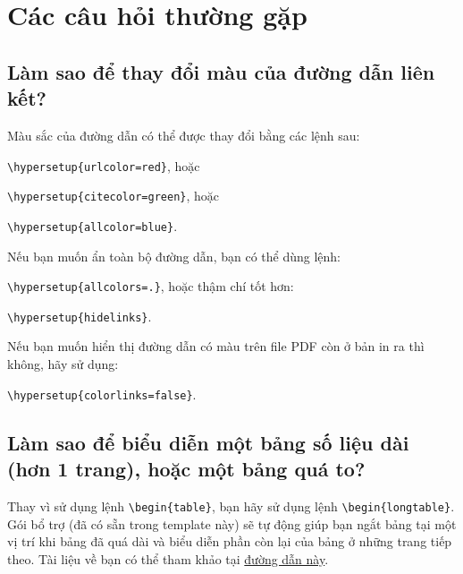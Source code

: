 
\chapter{Các câu hỏi thường gặp} %

\label{AppendixA} %


\section{Làm sao để thay đổi màu của đường dẫn liên kết?}

Màu sắc của đường dẫn có thể được thay đổi bằng các lệnh sau:

{\small\verb!\hypersetup{urlcolor=red}!}, hoặc

{\small\verb!\hypersetup{citecolor=green}!}, hoặc

{\small\verb!\hypersetup{allcolor=blue}!}.

\noindent Nếu bạn muốn ẩn toàn bộ đường dẫn, bạn có thể dùng lệnh:

{\small\verb!\hypersetup{allcolors=.}!}, hoặc thậm chí tốt hơn: 

{\small\verb!\hypersetup{hidelinks}!}.

\noindent Nếu bạn muốn hiển thị đường dẫn có màu trên file PDF còn ở bản in ra thì không, hãy sử dụng:

{\small\verb!\hypersetup{colorlinks=false}!}.



\section{Làm sao để biểu diễn một bảng số liệu dài (hơn 1 trang), hoặc một bảng quá to?}

Thay vì sử dụng lệnh {\small\verb!\begin{table}!}, bạn hãy sử dụng lệnh {\small\verb!\begin{longtable}!}. Gói bổ trợ  (đã có sẵn trong template này) sẽ tự động giúp bạn ngắt bảng tại một vị trí khi bảng đã quá dài và biểu diễn phần còn lại của bảng ở những trang tiếp theo. Tài liệu về  bạn có thể tham khảo tại \href{https://mirror.kku.ac.th/CTAN/macros/latex/required/tools/longtable.pdf}{đường dẫn này}.

